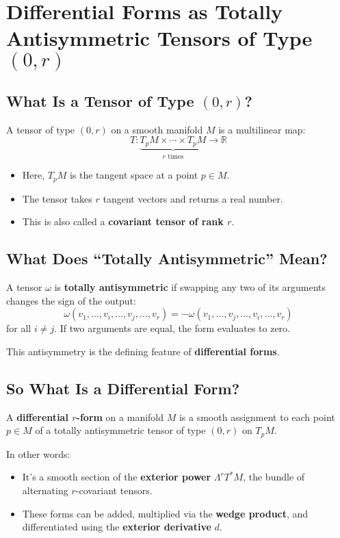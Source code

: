 \documentclass{article}
\begin{document}
	
	\section*{Differential Forms as Totally Antisymmetric Tensors of Type \((0, r)\)}
	
	\subsection*{What Is a Tensor of Type \((0, r)\)?}
	
	A tensor of type \((0, r)\) on a smooth manifold \( M \) is a multilinear map:
	\[
	T: \underbrace{T_pM \times \cdots \times T_pM}_{r \text{ times}} \to \mathbb{R}
	\]
	\begin{itemize}
		\item Here, \( T_pM \) is the tangent space at a point \( p \in M \).
		\item The tensor takes \( r \) tangent vectors and returns a real number.
		\item This is also called a \textbf{covariant tensor of rank \( r \)}.
	\end{itemize}
	
	\subsection*{What Does ``Totally Antisymmetric'' Mean?}
	
	A tensor \( \omega \) is \textbf{totally antisymmetric} if swapping any two of its arguments changes the sign of the output:
	\[
	\omega(v_1, \dots, v_i, \dots, v_j, \dots, v_r) = -\omega(v_1, \dots, v_j, \dots, v_i, \dots, v_r)
	\]
	for all \( i \neq j \). If two arguments are equal, the form evaluates to zero.
	
	This antisymmetry is the defining feature of \textbf{differential forms}.
	
	\subsection*{So What Is a Differential Form?}
	
	A \textbf{differential \( r \)-form} on a manifold \( M \) is a smooth assignment to each point \( p \in M \) of a totally antisymmetric tensor of type \((0, r)\) on \( T_pM \).
	
	In other words:
	\begin{itemize}
		\item It’s a smooth section of the \textbf{exterior power} \( \Lambda^r T^*M \), the bundle of alternating \( r \)-covariant tensors.
		\item These forms can be added, multiplied via the \textbf{wedge product}, and differentiated using the \textbf{exterior derivative} \( d \).
	\end{itemize}
	
\end{document}
